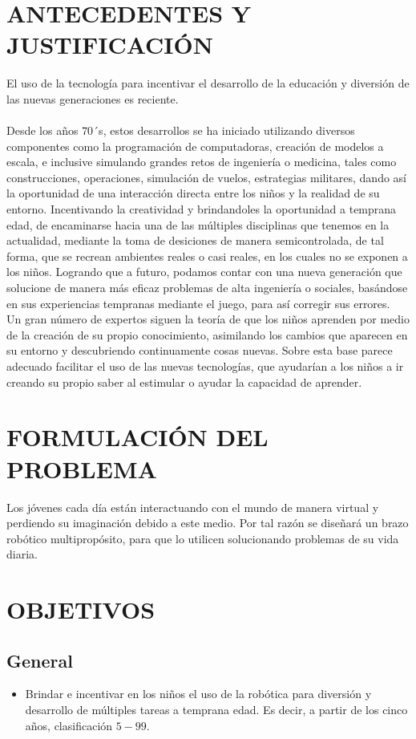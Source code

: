 \documentclass[10pt,graphicx,caption,rotating]{article}
\begin{document}
\section{ANTECEDENTES Y JUSTIFICACIÓN}
\noindent
El uso de la tecnología para incentivar el desarrollo de la educación y diversión de las nuevas generaciones es reciente.\\\\
Desde los años $70$´s, estos desarrollos se ha iniciado utilizando diversos componentes como la programación de computadoras, creación de modelos a escala, e inclusive simulando grandes retos de ingeniería o medicina, tales como construcciones, operaciones, simulación de vuelos, estrategias militares, dando así la oportunidad de una interacción directa entre los niños y la realidad de su entorno. Incentivando la creatividad y brindandoles la oportunidad a temprana edad, de encaminarse hacia una de las múltiples disciplinas que tenemos en la actualidad, mediante la toma de desiciones de manera semicontrolada, de tal forma, que se recrean ambientes reales o casi reales, en los cuales no se exponen a los niños. Logrando que a futuro, podamos contar con una nueva generación que solucione de manera más eficaz problemas de alta ingeniería o sociales, basándose en sus experiencias tempranas mediante el juego, para así corregir sus errores.\\
Un gran número de expertos siguen la teoría de que los niños aprenden por medio de la creación de su propio conocimiento, asimilando los cambios que aparecen en su entorno y descubriendo continuamente cosas nuevas. Sobre esta base parece adecuado facilitar el uso de las nuevas tecnologías, que ayudarían a los niños a ir creando su propio saber al estimular o ayudar la capacidad de aprender.

\section{FORMULACIÓN DEL PROBLEMA}
\noindent
Los jóvenes cada día están interactuando con el mundo de manera virtual y perdiendo su imaginación debido a este medio. Por tal razón se diseñará un brazo robótico multipropósito, para que lo utilicen solucionando problemas de su vida diaria.

\section{OBJETIVOS}
\subsection{General}
\begin{itemize}
 \item Brindar e incentivar en los niños el uso de la robótica para diversión y desarrollo de múltiples tareas a temprana edad. Es decir, a partir de los cinco años, clasificación $5 - 99$.
\end{itemize}
\end{document}
